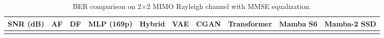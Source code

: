 \documentclass[
  english,
  12pt,
  12pt,
  a4paper,
  oneside]{report}
\begin{document}
\begin{longtable}[]{@{}
  >{\raggedright\arraybackslash}p{}
  >{\raggedright\arraybackslash}p{}
  >{\raggedright\arraybackslash}p{}
  >{\raggedright\arraybackslash}p{}
  >{\raggedright\arraybackslash}p{}
  >{\raggedright\arraybackslash}p{}
  >{\raggedright\arraybackslash}p{}
  >{\raggedright\arraybackslash}p{}
  >{\raggedright\arraybackslash}p{}
  >{\raggedright\arraybackslash}p{}@{}}
\caption{BER comparison on 2×2 MIMO Rayleigh channel with MMSE equalization.}\label{tbl:table5}\tabularnewline
\toprule\noalign{}
\begin{minipage}[b]{\linewidth}\raggedright
SNR (dB)
\end{minipage} & \begin{minipage}[b]{\linewidth}\raggedright
AF
\end{minipage} & \begin{minipage}[b]{\linewidth}\raggedright
DF
\end{minipage} & \begin{minipage}[b]{\linewidth}\raggedright
MLP (169p)
\end{minipage} & \begin{minipage}[b]{\linewidth}\raggedright
Hybrid
\end{minipage} & \begin{minipage}[b]{\linewidth}\raggedright
VAE
\end{minipage} & \begin{minipage}[b]{\linewidth}\raggedright
CGAN
\end{minipage} & \begin{minipage}[b]{\linewidth}\raggedright
Transformer
\end{minipage} & \begin{minipage}[b]{\linewidth}\raggedright
Mamba S6
\end{minipage} & \begin{minipage}[b]{\linewidth}\raggedright
Mamba-2 SSD
\end{minipage} \\
\midrule\noalign{}
\endfirsthead
\toprule\noalign{}
\begin{minipage}[b]{\linewidth}\raggedright

\end{minipage}
\end{longtable}
\end{document}
